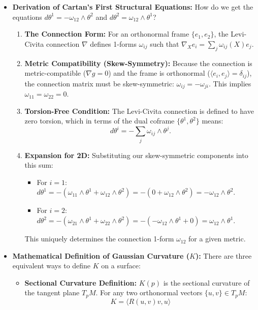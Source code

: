 \begin{solution}
\begin{itemize}
    \item \textbf{Derivation of Cartan's First Structural Equations:} 
        How do we get the equations $d\theta^1 = -\omega_{12} \wedge \theta^2$ and $d\theta^2 = \omega_{12} \wedge \theta^1$?
        \begin{enumerate}
            \item \textbf{The Connection Form:} For an orthonormal frame $\{e_1, e_2\}$, the Levi-Civita connection $\nabla$ defines 1-forms $\omega_{ij}$ such that $\nabla_X e_i = \sum_j \omega_{ij}(X) e_j$.
            \item \textbf{Metric Compatibility (Skew-Symmetry):} Because the connection is metric-compatible ($\nabla g = 0$) and the frame is orthonormal ($\langle e_i, e_j \rangle = \delta_{ij}$), the connection matrix must be skew-symmetric: $\omega_{ij} = -\omega_{ji}$. This implies $\omega_{11} = \omega_{22} = 0$.
            \item \textbf{Torsion-Free Condition:} The Levi-Civita connection is defined to have zero torsion, which in terms of the dual coframe $\{\theta^1, \theta^2\}$ means:
            \[ d\theta^i = -\sum_j \omega_{ij} \wedge \theta^j. \]
            \item \textbf{Expansion for 2D:} Substituting our skew-symmetric components into this sum:
            \begin{itemize}
                \item For $i=1$: $d\theta^1 = -(\omega_{11} \wedge \theta^1 + \omega_{12} \wedge \theta^2) = -(0 + \omega_{12} \wedge \theta^2) = -\omega_{12} \wedge \theta^2$.
                \item For $i=2$: $d\theta^2 = -(\omega_{21} \wedge \theta^1 + \omega_{22} \wedge \theta^2) = -(-\omega_{12} \wedge \theta^1 + 0) = \omega_{12} \wedge \theta^1$.
            \end{itemize}
            This uniquely determines the connection 1-form $\omega_{12}$ for a given metric.
        \end{enumerate}
        \item \textbf{Mathematical Definition of Gaussian Curvature ($K$):} 
 There are three equivalent ways to define $K$ on a surface:
    \begin{itemize}
        \item \textbf{Sectional Curvature Definition:} $K(p)$ is the sectional curvature of the tangent plane $T_pM$. For any two orthonormal vectors $\{u, v\} \in T_pM$:
        \begin{equation*}
            K = \langle R(u, v)v, u \rangle

\end{equation*}
\end{itemize}
\end{itemize}
\end{solution}
